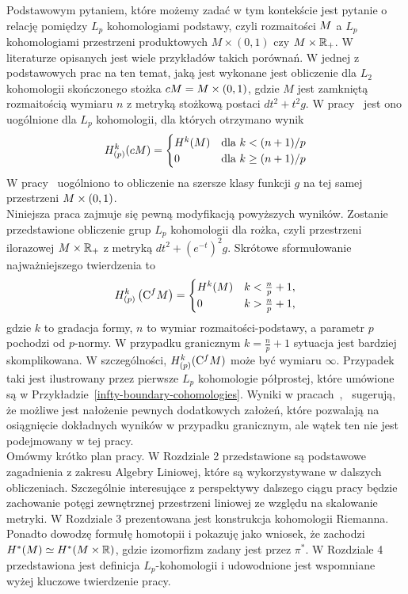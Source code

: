 \documentclass[licencjacka]{pracamgr}
\theoremstyle{definition}
\theoremstyle{definition}
\theoremstyle{plain}
\theoremstyle{plain}
\theoremstyle{plain}
\theoremstyle{plain}
\theoremstyle{plain}
\def\cfm{\ensuremath\mathrm{C}^fM}
\def\M{\ensuremath M}
\def\R{\ensuremath\mathbb{R}}
\begin{document}
Podstawowym pytaniem, które możemy zadać w tym kontekście jest pytanie o
relację pomiędzy $L_p$ kohomologiami podstawy, czyli rozmaitości $\M$ a $L_p$
kohomologiami przestrzeni produktowych $M \times (0,1) $ czy $\M \times
\R_{+}$.  W literaturze opisanych jest wiele przykładów takich porównań.  W
jednej z podstawowych prac na ten temat, jaką jest \cite{cheeger} wykonane
jest obliczenie dla $L_2$ kohomologii skończonego stożka $ c\M = \M \times (0,
1)$, gdzie $M$ jest zamkniętą rozmaitością wymiaru $n$ z metryką stożkową
postaci $dt^2 + t^2 g$. W pracy~\cite{weber} jest ono uogólnione dla $L_p$
kohomologii, dla których otrzymano wynik
\[
H^k_{(p)} (c\M) = \begin{cases}
H^k (M) & \text{dla}~k < (n+1)/p \\
0 & \text{dla}~k \geq (n+1)/p \\
\end{cases}
\]
W pracy~\cite{youssin} uogólniono to obliczenie na szersze klasy funkcji $g$ na
tej samej przestrzeni $\M \times (0,1)$.  \\

Niniejsza praca zajmuje się pewną modyfikacją powyższych wyników.
Zostanie przedstawione obliczenie grup $L_p$ kohomologii dla rożka, czyli
przestrzeni ilorazowej $\M \times \R_{+}$ z metryką $dt^2 + (e^{-t})^2 g$.
Skrótowe sformułowanie najważniejszego twierdzenia to 
\begin{equation}
    H_{(p)}^k \left( \cfm \right) = \begin{cases}
      H^k(M) & k < \frac{n}{p} + 1, \\
      0 & k >  \frac{n}{p} + 1, \\
      \end{cases}
\end{equation}
gdzie $k$ to gradacja formy, $n$ to wymiar rozmaitości-podstawy, a parametr $p$
pochodzi od $p$-normy.  W przypadku granicznym $k = \frac{n}{p} + 1$ sytuacja
jest bardziej skomplikowana.  W szczególności, $H^k_{(p)}(\cfm)$ może być wymiaru
$\infty$.  Przypadek taki jest ilustrowany przez pierwsze $L_p$ kohomologie
półprostej, które umówione są w Przykładzie~\ref{infty-boundary-cohomologies}.
Wyniki w pracach~\cite{youssin},~\cite{weber} sugerują, że możliwe jest
nałożenie pewnych dodatkowych założeń, które pozwalają na osiągnięcie
dokładnych  wyników w przypadku granicznym, ale wątek ten nie jest podejmowany
w tej pracy.  \\

Omówmy krótko plan pracy.  W Rozdziale 2 przedstawione są podstawowe
zagadnienia z zakresu Algebry Liniowej, które są wykorzystywane w dalszych
obliczeniach. Szczególnie interesujące z perspektywy dalszego ciągu pracy
będzie zachowanie potęgi zewnętrznej przestrzeni liniowej ze względu na
skalowanie metryki.  W Rozdziale 3 prezentowana jest konstrukcja kohomologii
Riemanna. Ponadto dowodzę formułę homotopii i pokazuję jako wniosek, że
zachodzi $H^*(M) \simeq H^*(M\times \R)$, gdzie izomorfizm zadany jest przez
$\pi^*$. W Rozdziale 4 przedstawiona jest definicja $L_p$-kohomologii i
udowodnione jest wspomniane wyżej kluczowe twierdzenie pracy.
\end{document}
